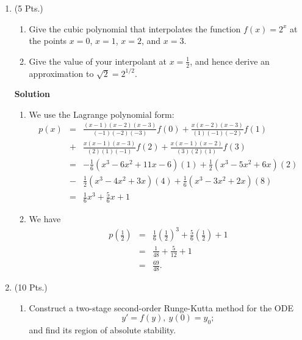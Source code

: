 \documentclass{article}
\begin{document}
\begin{enumerate}
\begin{enumerate}
\end{enumerate}



\item (5 Pts.)

\begin{enumerate}
\item Give the cubic polynomial that interpolates the function \(f(x) = 2^x\) at the points \(x = 0\), \(x = 1\), \(x = 2\), and \(x = 3\).

\item Give the value of your interpolant at \(x = \frac{1}{2}\), and hence derive an approximation to \(\sqrt{2} = 2^{1/2}\).

\end{enumerate}

{\bf Solution}

\begin{enumerate}
\item We use the Lagrange polynomial form:
\begin{eqnarray*}
p(x) & = & \frac{(x - 1)(x - 2)(x - 3)}{(-1)(-2)(-3)} f(0)
         + \frac{x(x - 2)(x - 3)}{(1)(-1)(-2)} f(1) \\
     & + & \frac{x(x - 1)(x - 3)}{(2)(1)(-1)} f(2)
         + \frac{x(x - 1)(x - 2)}{(3)(2)(1)} f(3) \\
     & = & -\frac{1}{6} \left( x^3 - 6x^2 + 11x - 6 \right) (1)
         +  \frac{1}{2} \left( x^3 - 5x^2 + 6x \right) (2) \\
     & - &  \frac{1}{2} \left( x^3 - 4x^2 + 3x \right) (4)
         +  \frac{1}{6} \left( x^3 - 3x^2 + 2x \right) (8) \\
     & = & \frac{1}{6} x^3 + \frac{5}{6} x + 1
\end{eqnarray*}

\item We have
\begin{eqnarray*}
p \left( \frac{1}{2} \right)
& = & \frac{1}{6} \left( \frac{1}{2} \right)^3 + \frac{5}{6} \left( \frac{1}{2} \right) + 1 \\
& = & \frac{1}{48} + \frac{5}{12} + 1 \\
& = & \frac{69}{48}.
\end{eqnarray*}

\end{enumerate}



\item (10 Pts.)

\begin{enumerate}
\item Construct a two-stage second-order Runge-Kutta method for the ODE
\[y' = f(y), \ y(0) = y_0;\]
and find its region of absolute stability.


\end{enumerate}
\end{enumerate}
\end{document}
